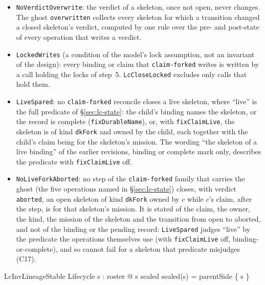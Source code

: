 \documentclass[a4paper,10pt,fleqn]{article}
\newcommand{\field}[1]{\texttt{#1}}
\begin{document}
\begin{itemize}
    (including release and the close-time clearing). The model has one such writer of a
    Tier B skeleton (the dispatch), so the invariant is a predicate over the
    set of aborted skeletons.
  \item \field{NoVerdictOverwrite}: the verdict of a skeleton, once not open,
    never changes. The ghost \field{overwritten} collects every skeleton for
    which a transition changed a closed skeleton's verdict, computed by one
    rule over the pre- and post-state of every operation that writes a verdict.
  \item \field{LockedWrites} (a condition of the model's lock assumption, not
    an invariant of the design): every binding or claim that
    \field{claim-forked} writes is written by a call holding the locks of
    step~5. \field{LcCloseLocked} excludes only calls that hold them.
  \item \field{LiveSpared}: no \field{claim-forked} reconcile closes a live
    skeleton, where ``live'' is the full predicate of
    \S\ref{sec:lc-state}: the child's binding names the skeleton, or the
    record is complete (\field{fixDurableName}), or, with
    \field{fixClaimLive}, the skeleton is of kind \field{dkFork} and owned by
    the child, each together with the child's claim being for the skeleton's
    mission. The wording ``the skeleton of a live binding'' of the earlier
    revisions, binding or complete mark only, describes the predicate with
    \field{fixClaimLive} off.
  \item \field{NoLiveForkAborted}: no step of the \field{claim-forked} family
    that carries the ghost (the five operations named in \S\ref{sec:lc-state})
    closes, with verdict \field{aborted}, an open skeleton of kind
    \field{dkFork} owned by $c$ while $c$'s claim, after the step, is for that
    skeleton's mission. It is stated of the claim, the owner, the kind, the
    mission of the skeleton and the transition from open to aborted, and not
    of the binding or the pending record: \field{LiveSpared} judges ``live''
    by the predicate the operations themselves use (with \field{fixClaimLive}
    off, binding-or-complete), and so cannot fail for a skeleton that
    predicate misjudges (C17).
\end{itemize}

\begin{schema}{LcInvLineageStable}
Lifecycle
\where
\forall s : roster @ s \in \dom sealed \land sealed(s) = parentSide \limg \{ s \} \rimg
\end{schema}
\end{document}
